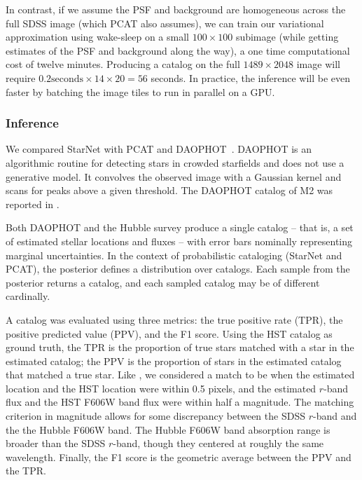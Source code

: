 In contrast, if we assume the PSF and background are homogeneous 
across the full SDSS image (which PCAT also assumes), we can 
train our variational approximation using wake-sleep 
on a small $100 \times 100$ subimage
(while getting estimates of the PSF and background along the way),
a one time computational cost of twelve minutes. 
Producing a catalog on the full $1489 \times 2048$ image will require 
$0.2\text{seconds} \times 14 \times 20 = 56$ seconds. In practice, 
the inference will be even faster by batching the image tiles to run in parallel on a GPU. 



\subsubsection{Inference}
\label{sec:m2_results}
We compared StarNet with PCAT and DAOPHOT~\cite{stetson2987daophot}. 
DAOPHOT is an algorithmic routine for detecting stars in crowded starfields and does not use a generative model. 
It convolves the observed image with a Gaussian kernel and scans for peaks above a given threshold. 
The DAOPHOT catalog of M2 was reported in 
\cite{An_2008_m2}. 

Both DAOPHOT and the Hubble survey produce a single catalog -- that is, a set of estimated stellar locations and fluxes -- with
error bars nominally representing marginal uncertainties.
In the context of probabilistic cataloging (StarNet and PCAT), the posterior 
defines a distribution over catalogs.
Each sample from the posterior returns a catalog, and each 
sampled catalog may be of different cardinally. 

A catalog was evaluated using three metrics: the true positive rate (TPR), the positive predicted value (PPV), and the F1 score. Using the HST catalog as ground truth, the TPR is the proportion of true stars matched with a star in the estimated catalog;
the PPV is the proportion of stars in the estimated catalog that matched a true star. Like \cite{Portillo_2017, Feder_2019}, we considered a match to be when the estimated location and the HST location were within 0.5 pixels,
and the estimated $r$-band flux and the HST F606W band flux were within half a
magnitude. 
The matching criterion in magnitude allows for some discrepancy between the SDSS $r$-band and the the Hubble F606W band. 
The Hubble F606W band absorption range is broader than the SDSS $r$-band, though they centered at roughly the same wavelength. Finally, the F1 score is the geometric average between the PPV and the TPR. 

